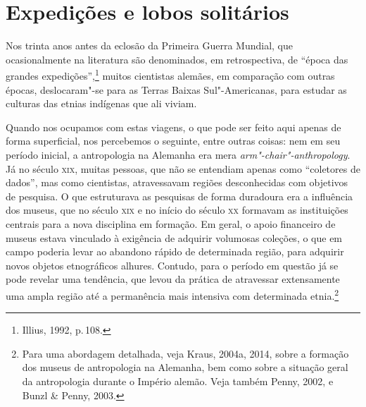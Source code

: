 \section{Expedições e lobos solitários}
Nos trinta anos antes da eclosão da Primeira Guerra Mundial, que
ocasionalmente na literatura são denominados, em retrospectiva, de
``época das grandes expedições'',\footnote{Illius, 1992, p.\,108.} muitos
cientistas alemães, em comparação com outras épocas, deslocaram"-se para
as Terras Baixas Sul"-Americanas, para estudar as culturas das etnias
indígenas que ali viviam.

Quando nos ocupamos com estas viagens, o que pode ser feito aqui apenas
de forma superficial, nos percebemos o seguinte, entre outras coisas:
nem em seu período inicial, a antropologia na Alemanha era mera
\textit{arm"-chair"-anthropology}. Já no século \textsc{xix}, muitas pessoas, que não
se entendiam apenas como ``coletores de dados'', mas como cientistas,
atravessavam regiões desconhecidas com objetivos de pesquisa. O que
estruturava as pesquisas de forma duradoura era a influência dos
museus, que no século \textsc{xix} e no início do século \textsc{xx} formavam as
instituições centrais para a nova disciplina em formação. Em geral, o
apoio financeiro de museus estava vinculado à exigência de adquirir
volumosas coleções, o que em campo poderia levar ao abandono rápido de
determinada região, para adquirir novos objetos etnográficos alhures.
Contudo, para o período em questão já se pode revelar uma tendência, que
levou da prática de atravessar extensamente uma ampla região até a
permanência mais intensiva com determinada etnia.\footnote{Para uma
  abordagem detalhada, veja Kraus, 2004a, 2014, sobre a formação dos
  museus de antropologia na Alemanha, bem como sobre a situação geral
  da antropologia durante o Império alemão. Veja também Penny, 2002, e
  Bunzl \& Penny, 2003.}


